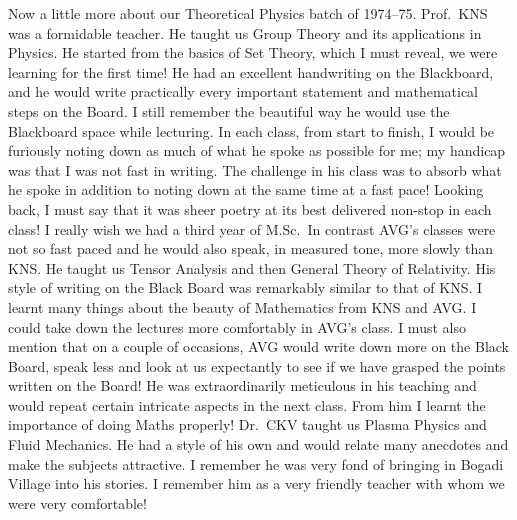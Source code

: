 Now a little more about our Theoretical Physics batch of 1974--75. Prof.\ KNS was a formidable teacher. He taught us Group Theory and its applications in Physics. He started from the basics of Set Theory, which I must reveal, we were learning for the first time! He had an excellent handwriting on the Blackboard, and he would write practically every important statement and mathematical steps on the Board. I still remember the beautiful way he would use the Blackboard space while lecturing. In each class, from start to finish, I would be furiously noting down as much of what he spoke as possible for me; my handicap was that I was not fast in writing. The challenge in his class was to absorb what he spoke in addition to noting down at the same time at a fast pace! Looking back, I must say that it was sheer poetry at its best delivered non-stop in each class! I really wish we had a third year of M.Sc.\ In contrast AVG's classes were not so fast paced and he would also speak, in measured tone, more slowly than KNS. He taught us Tensor Analysis and then General Theory of Relativity. His style of writing on the Black Board was remarkably similar to that of KNS. I learnt many things about the beauty of Mathematics from KNS and AVG. I could take down the lectures more comfortably in AVG's class. I must also mention that on a couple of occasions, AVG would write down more on the Black Board, speak less and look at us expectantly to see if we have grasped the points written on the Board! He was extraordinarily meticulous in his teaching and would repeat certain intricate aspects in the next class. From him I learnt the importance of doing Maths properly! Dr.\ CKV taught us Plasma Physics and Fluid Mechanics. He had a style of his own and would relate many anecdotes and make the subjects attractive. I remember he was very fond of bringing in Bogadi Village into his stories. I remember him as a very friendly teacher with whom we were very comfortable!
\vskip 2pt

